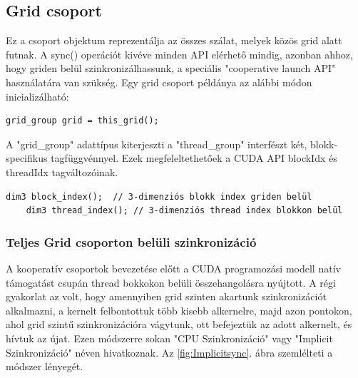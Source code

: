 \subsection{Grid csoport}
Ez a csoport objektum reprezentálja az összes szálat, melyek közös grid alatt futnak. A sync() operációt kivéve minden API elérhető mindig, azonban ahhoz, hogy griden belül szinkronizálhassunk, a speciális "cooperative launch API" használatára van szükség.
Egy grid csoport példánya az alábbi módon inicializálható:
\begin{lstlisting}[style=CStyle]
	grid_group grid = this_grid();
\end{lstlisting}
A "grid\_group" adattípus kiterjeszti a "thread\_group" interfészt két, blokk-specifikus tagfüggvénnyel. Ezek megfeleltethetőek a CUDA API blockIdx és threadIdx tagváltozóinak.
\begin{lstlisting}[style=CStyle]
	dim3 block_index();  // 3-dimenziós blokk index griden belül
	dim3 thread_index(); // 3-dimenziós thread index blokkon belül
\end{lstlisting}

\subsubsection{Teljes Grid csoporton belüli szinkronizáció}
\label{subsubsec:Grid}
A kooperatív csoportok bevezetése előtt a CUDA programozási modell natív támogatást csupán thread bokkokon belüli összehangolásra nyújtott. A régi gyakorlat az volt, hogy amennyiben grid szinten akartunk szinkronizációt alkalmazni, a kernelt felbontottuk több kisebb alkernelre, majd azon pontokon, ahol grid szintű szinkronizációra vágytunk, ott befejeztük az adott alkernelt, és hívtuk az újat. Ezen módszerre sokan "CPU Szinkronizáció" vagy "Implicit Szinkronizáció" néven hivatkoznak. Az \ref{fig:Implicitsync}. ábra szemlélteti a módszer lényegét. \cite{implicitSzink}

